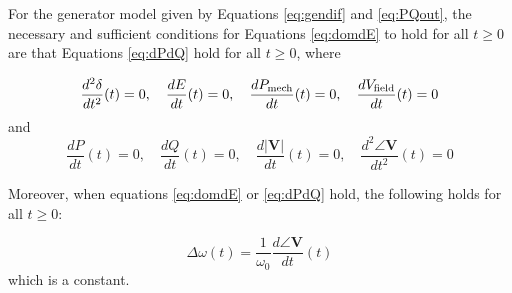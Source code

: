 \documentclass[graybox, envcountchap]{svmult}
\begin{document}
\begin{theorem} \label{thm:outst}

For the generator model given by Equations \ref{eq:gendif} and \ref{eq:PQout},
the necessary and sufficient conditions for Equations \ref{eq:domdE} to hold for
all $t \geq 0$ are that Equations \ref{eq:dPdQ} hold for all $t \geq 0$, where

\begin{equation}\label{eq:domdE}
  \frac{d^2 \delta}{dt^2}(t)=0
  ,\quad
  \frac{dE}{dt}(t)=0
  ,\quad
  \frac{d P_{\rm mech}}{dt}(t)=0
  ,\quad
  \frac{d V_{\rm field}}{dt}(t)=0
\end{equation}
and
\begin{equation}\label{eq:dPdQ}
  \frac{dP}{dt}(t)=0
  ,\quad
  \frac{dQ}{dt}(t)=0
  ,\quad
  \frac{d|\bm{V}|}{dt}(t)=0
  ,\quad
  \frac{d^2 \angle \bm{V}}{dt^2}(t)=0
\end{equation}

Moreover, when equations \ref{eq:domdE} or \ref{eq:dPdQ} hold, the following
holds for all $t \geq 0$:

\begin{equation}\label{eq:frer}
  \Delta \omega(t)= \frac{1}{\omega_0}\frac{d \angle \bm{V}}{dt}(t)
\end{equation}
which is a constant.

\end{theorem}
\end{document}
